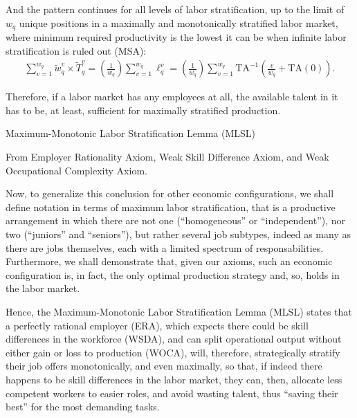 \documentclass[hidelinks, nonatbib]{elsarticle}
\begin{document}
And the pattern continues for all levels of labor stratification, up to the limit of $w_q$ unique positions in a maximally and monotonically stratified labor market, where minimum required productivity is the lowest it can be when infinite labor stratification is ruled out (MSA):
\begin{gather}
\sum_{v=1}^{w_q}{
    \tilde{w}_{q}^{v}
    \times
    \tilde{T}_{q}^{v}
}
=
\left(
    \frac{1}{w_q}
\right)
\sum_{v=1}^{w_q}{
    \ell_{q}^{v}
}
=
\left(
    \frac{1}{w_q}
\right)
\sum_{v=1}^{w_q}{
    \text{TA}^{-1}\left(
    \frac{v}{w_q}
    +
    \text{TA}(0)
\right)
}
.
\end{gather}

Therefore, if a labor market has any employees at all, the available talent in it has to be, at least, sufficient for maximally stratified production.

Maximum-Monotonic Labor Stratification Lemma (MLSL)

    From Employer Rationality Axiom, Weak Skill Difference Axiom, and Weak Occupational Complexity Axiom.
    
        Now, to generalize this conclusion for other economic configurations, we shall define notation in terms of maximum labor stratification, that is a productive arrangement in which there are not one (``homogeneous'' or ``independent''), nor two (``juniors'' and ``seniors''), but rather several job subtypes, indeed as many as there are jobs themselves, each with a limited spectrum of responsabilities. Furthermore, we shall demonstrate that, given our axioms, such an economic configuration is, in fact, the only optimal production strategy and, so, holds in the labor market.
        
        Hence, the Maximum-Monotonic Labor Stratification Lemma (MLSL) states that a perfectly rational employer (ERA), which expects there could be skill differences in the workforce (WSDA), and can split operational output without either gain or loss to production (WOCA), will, therefore, strategically stratify their job offers monotonically, and even maximally, so that, if indeed there happens to be skill differences in the labor market, they can, then, allocate less competent workers to easier roles, and avoid wasting talent, thus ``saving their best'' for the most demanding tasks.
        
\end{document}
